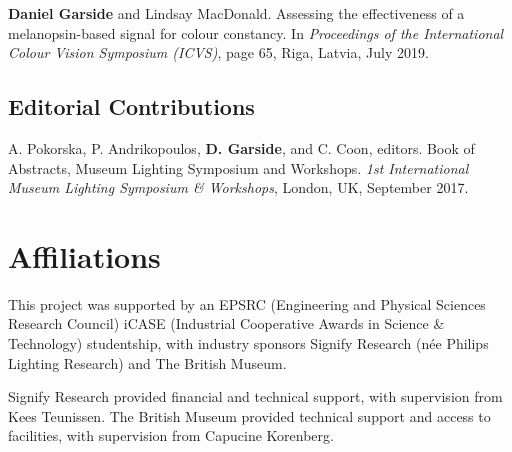 {\textbf{Daniel Garside} and Lindsay MacDonald. Assessing the effectiveness of a melanopsin-based signal for colour constancy. In \textit{Proceedings of the International Colour Vision Symposium (ICVS)}, page 65, Riga, Latvia, July 2019. 
\bigskip

\subsection*{Editorial Contributions}
A. Pokorska, P. Andrikopoulos, \textbf{D. Garside}, and C. Coon, editors. Book of Abstracts, Museum Lighting Symposium and Workshops.  \textit{1st International Museum Lighting Symposium \& Workshops}, London, UK, September 2017. 

}

\section{Affiliations}
This project was supported by an EPSRC (Engineering and Physical Sciences Research Council) iCASE (Industrial Cooperative Awards in Science \& Technology) studentship, with industry sponsors Signify Research (née Philips Lighting Research) and The British Museum.

Signify Research provided financial and technical support, with supervision from Kees Teunissen. The British Museum provided technical support and access to facilities, with supervision from Capucine Korenberg. 